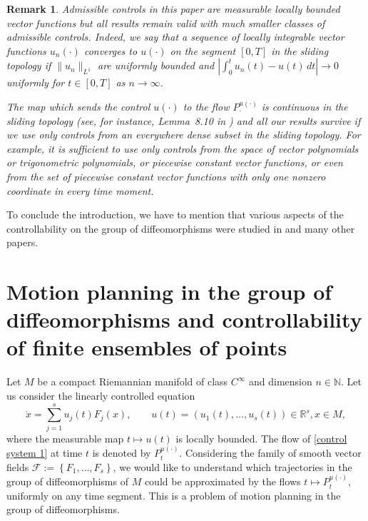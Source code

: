 \documentclass[10pt]{article}
\newcommand{\R}{{\mathbb R}}
\newcommand{\N}{{\mathbb N}}
\newcommand{\F}{\mathcal F}
\newtheorem{rem}{Remark}
\begin{document}
 \begin{rem} Admissible controls in this paper are measurable locally bounded vector functions but all results remain valid with much smaller classes of admissible controls. Indeed, we say that a sequence of locally integrable vector functions $u_n(\cdot)$ converges to $u(\cdot)$ on the segment
$[0,T]$ in the \it{sliding topology} if $\|u_n\|_{L^1}$ are uniformly bounded and $\left|\int_0^tu_n(t)-u(t)\,dt\right|\to 0$ uniformly for
$t\in[0,T]$ as $n\to\infty$.

The map which sends the control $u(\cdot)$ to the flow $P^{u(\cdot)}_\cdot$ is continuous in the sliding topology (see, for instance, Lemma~8.10
in \cite{AgSa}) and all our results survive if we use only controls from an everywhere dense subset in the sliding topology. For example, it is
sufficient to use only controls from the space of vector polynomials or trigonometric polynomials, or piecewise constant vector functions, or
even from the set of piecewise constant vector functions with only one nonzero coordinate in every time moment.
\end{rem}  

To conclude the introduction, we have to mention that various aspects of the controllability on the group of diffeomorphisms were studied in
\cite{AgCa,ArTr,BePo25(1),BePo25(2),BeTu,DuNer,KaPoSi,Ner,PoSca,Sca} and many other papers.  


\section{Motion planning in the group of diffeomorphisms and controllability of finite ensembles of points}

Let $M$ be a compact Riemannian manifold of class $C^{\infty}$ and dimension $n \in \N$. Let us consider the linearly controlled equation
\begin{equation} \label{control system 1}
    \dot{x}=\sum_{j=1}^su_j(t)F_j(x), \qquad u(t)=(u_1(t),\dots,u_s(t))\in \R^s,x\in M,
\end{equation}
where the measurable map $t\mapsto u(t)$ is locally bounded. The flow of \eqref{control system 1} at time $t$ is denoted by $P^{u(\cdot)}_t$. Considering the family of smooth vector fields $\F:=\left\{F_1,\dots,F_s\right\}$, we would like to understand which trajectories in the group of diffeomorphisms of $M$ could be approximated by the flows $t \mapsto P^{u(\cdot)}_t$, uniformly on any time segment. This is a problem of motion planning in the group of diffeomorphisms. 
\end{document}
